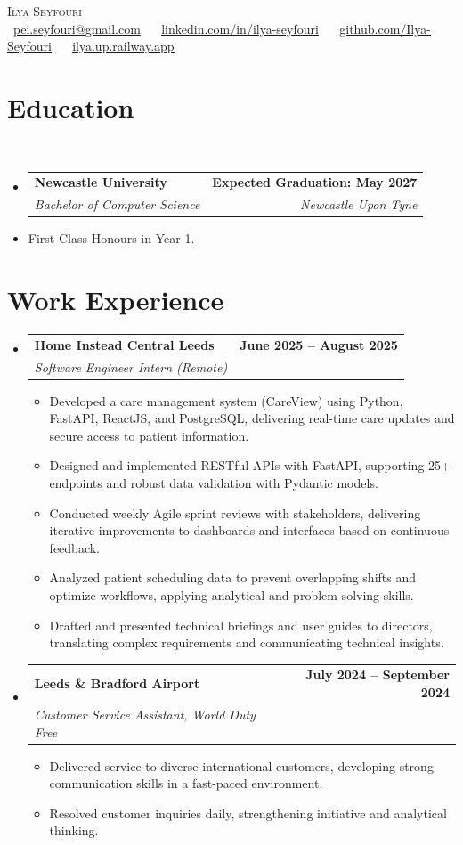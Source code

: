 \documentclass[letterpaper,11pt]{article}
\makeatletter
\newcommand{\resumeItem}[1]{
  \item\small{
    {#1 \vspace{0pt}}
  }
}
\newcommand{\resumeSubheading}[4]{
  \vspace{-2pt}\item
    \begin{tabular*}{1.0\textwidth}[t]{l@{\extracolsep{\fill}}r}
      \textbf{#1} & \textbf{\small #2} \\
      \textit{\small#3} & \textit{\small #4} \\
    \end{tabular*}\vspace{-7pt}
}
\newcommand{\resumeSubHeadingListStart}{\begin{itemize}[leftmargin=0.0in, label={}]}
\newcommand{\resumeSubHeadingListEnd}{\end{itemize}}\vspace{0pt}
\newcommand{\resumeItemListStart}{\begin{itemize}}
\newcommand{\resumeItemListEnd}{\end{itemize}\vspace{-5pt}}
\makeatother
\begin{document}
\begin{center}
    {\Large \scshape Ilya Seyfouri} \\[2mm]
    \footnotesize \raisebox{-0.1\height}
    {\faEnvelope\ \underline{pei.seyfouri@gmail.com}} ~ 
    {\faLinkedin\ \underline{\href{https://linkedin.com/in/ilya-seyfouri}{linkedin.com/in/ilya-seyfouri}}}  ~
    {\faGithub\ \underline{\href{https://github.com/Ilya-Seyfouri}{github.com/Ilya-Seyfouri}}} ~
    {\faBriefcase\ \underline{\href{https://ilya.up.railway.app}{ilya.up.railway.app}}}
    \vspace{-8pt}
\end{center}

\section{Education} \\[1mm]
  \resumeSubHeadingListStart
    \resumeSubheading
      {Newcastle University}{Expected Graduation: May 2027}
      {Bachelor of Computer Science
      }{Newcastle Upon Tyne}
  \resumeSubHeadingListEnd
    \resumeItemListStart
        \resumeItem {First Class Honours in Year 1.}
    \resumeItemListEnd

\section{Work Experience}
    \resumeSubHeadingListStart
        \resumeSubheading{Home Instead Central Leeds}{June 2025 -- August 2025}{Software Engineer Intern (Remote)}{}
            \resumeItemListStart
                \resumeItem{Developed a care management system (CareView) using Python, FastAPI, ReactJS, and PostgreSQL, delivering real-time care updates and secure access to patient information.}
                \resumeItem{Designed and implemented RESTful APIs with FastAPI, supporting 25+ endpoints and robust data validation with Pydantic models.}
                \resumeItem{Conducted weekly Agile sprint reviews with stakeholders, delivering iterative improvements to dashboards and interfaces based on continuous feedback.}
                \resumeItem{Analyzed patient scheduling data to prevent overlapping shifts and optimize workflows, applying analytical and problem-solving skills.}
                \resumeItem{Drafted and presented technical briefings and user guides to directors, translating complex requirements and communicating technical insights.}
            \resumeItemListEnd
        \resumeSubheading{Leeds \& Bradford Airport}{July 2024 -- September 2024}{Customer Service Assistant, World Duty Free}{}
            \resumeItemListStart
                \resumeItem{Delivered service to diverse international customers, developing strong communication skills in a fast-paced environment.}
                \resumeItem{Resolved customer inquiries daily, strengthening initiative and analytical thinking.}
            \resumeItemListEnd
    \resumeSubHeadingListEnd
\end{document}
